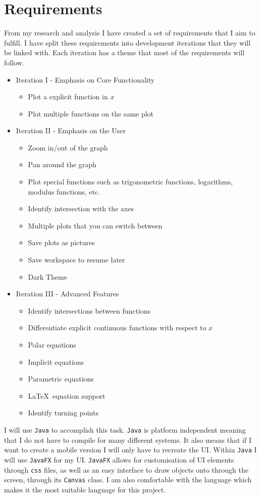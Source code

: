 \documentclass[../../../main.tex]{subfiles}
\begin{document}
\chapter{Requirements}
From my research and analysis I have created a set of requirements that I aim to fulfill. I have split these requirements into development iterations that they will be linked with. Each iteration has a theme that most of the requirements will follow.
\begin{itemize}
	\item Iteration I - Emphasis on Core Functionality
		\begin{itemize}
			\item Plot a explicit function in $x$
			\item Plot multiple functions on the same plot
		\end{itemize}
	\item Iteration II - Emphasis on the User
		\begin{itemize}
			\item Zoom in/out of the graph
			\item Pan around the graph
			\item Plot special functions such as trigonometric functions, logarithms, modulus functions, etc.
			\item Identify intersection with the axes
			\item Multiple plots that you can switch between
			\item Save plots as pictures
			\item Save workspace to resume later
			\item Dark Theme
		\end{itemize}
	\item Iteration III - Advanced Features
		\begin{itemize}
			\item Identify intersections between functions
			\item Differentiate explicit continuous functions with respect to $x$
			\item Polar equations
			\item Implicit equations
			\item Parametric equations
			\item \LaTeX \ equation support
			\item Identify turning points 
		\end{itemize}
\end{itemize}
I will use \texttt{Java} to accomplish this task. \texttt{Java} is platform independent meaning that I do not have to compile for many different systems. It also means that if I want to create a mobile version I will only have to recreate the UI. Within \texttt{Java} I will use \texttt{JavaFX} for my UI. \texttt{JavaFX} allows for customisation of UI elements through \texttt{css} files, as well as an easy interface to draw objects onto through the screen, through its \texttt{Canvas} class.  I am also comfortable with the language which makes it the most suitable language for this project.
\end{document}

